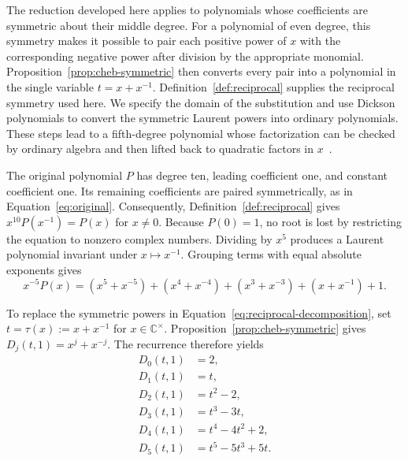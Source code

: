 \documentclass[11pt,a4paper]{article}
\numberwithin{equation}{section}
\theoremstyle{uprightpaper}
\newcommand{\C}{\mathbb{C}}
\begin{document}
The reduction developed here applies to polynomials whose coefficients are symmetric about their middle degree. For a polynomial of even degree, this symmetry makes it possible to pair each positive power of $x$ with the corresponding negative power after division by the appropriate monomial. Proposition~\ref{prop:cheb-symmetric} then converts every pair into a polynomial in the single variable $t=x+x^{-1}$. Definition~\ref{def:reciprocal} supplies the reciprocal symmetry used here. We specify the domain of the substitution and use Dickson polynomials to convert the symmetric Laurent powers into ordinary polynomials. These steps lead to a fifth-degree polynomial whose factorization can be checked by ordinary algebra and then lifted back to quadratic factors in $x$~\cite{barbeau1989,needham1997,lidl1993}.

The original polynomial $P$ has degree ten, leading coefficient one, and constant coefficient one. Its remaining coefficients are paired symmetrically, as in Equation~\eqref{eq:original}. Consequently, Definition~\ref{def:reciprocal} gives $x^{10}P(x^{-1})=P(x)$ for $x\ne0$. Because $P(0)=1$, no root is lost by restricting the equation to nonzero complex numbers. Dividing by $x^5$ produces a Laurent polynomial invariant under $x\mapsto x^{-1}$. Grouping terms with equal absolute exponents gives
\begin{equation}\label{eq:reciprocal-decomposition}
 x^{-5}P(x)=(x^5+x^{-5})+(x^4+x^{-4})+(x^3+x^{-3})+(x+x^{-1})+1.
\end{equation}

To replace the symmetric powers in Equation~\eqref{eq:reciprocal-decomposition}, set $t=\tau(x):=x+x^{-1}$ for $x\in\C^\times$. Proposition~\ref{prop:cheb-symmetric} gives $D_j(t,1)=x^j+x^{-j}$. The recurrence therefore yields
\begin{subequations}\label{eq:reciprocal-V}
\begin{align}
 D_0(t,1)&=2,\label{eq:reciprocal-D0}\\
 D_1(t,1)&=t,\label{eq:reciprocal-D1}\\
 D_2(t,1)&=t^2-2,\label{eq:reciprocal-D2}\\
 D_3(t,1)&=t^3-3t,\label{eq:reciprocal-D3}\\
 D_4(t,1)&=t^4-4t^2+2,\label{eq:reciprocal-D4}\\
 D_5(t,1)&=t^5-5t^3+5t.\label{eq:reciprocal-D5}
\end{align}
\end{subequations}
\end{document}
